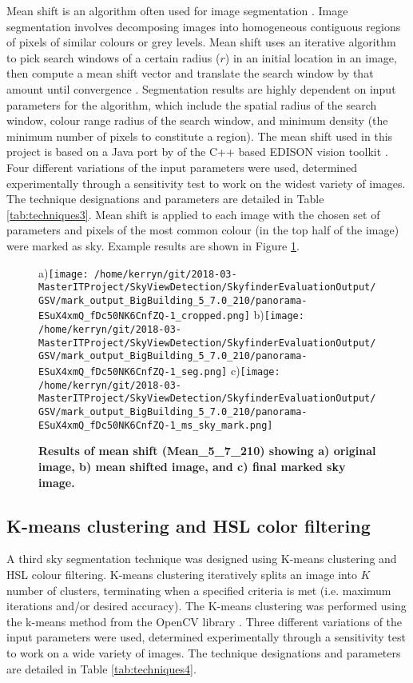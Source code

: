 \documentclass[final,3p,times,authoryear]{elsarticle}
\begin{document}
Mean shift is an algorithm often used for image segmentation \citep{Comaniciu1997,Comaniciu2002}. Image segmentation involves decomposing images into homogeneous contiguous regions of pixels of similar colours or grey levels. Mean shift uses an iterative algorithm to pick search windows of a certain radius ($r$) in an initial location in an image, then compute a mean shift vector and translate the search window by that amount until convergence \citep{Comaniciu1997}. Segmentation results are highly dependent on input parameters for the algorithm, which include the spatial radius of the search window, colour range radius of the search window, and minimum density (the minimum number of pixels to constitute a region). The mean shift used in this project is based on a Java port by \cite{Pangburn2002} of the C++ based EDISON vision toolkit \citep{Christoudias2002}. Four different variations of the input parameters were used, determined experimentally through a sensitivity test to work on the widest variety of images. The technique designations and parameters are detailed in Table \ref{tab:techniques3}. Mean shift is applied to each image with the chosen set of parameters and pixels of the most common colour (in the top half of the image) were marked as sky. Example results are shown in Figure \ref{fig:meanresults}.


\begin{figure}
\centering    
a)\texttt{[image: /home/kerryn/git/2018-03-MasterITProject/SkyViewDetection/SkyfinderEvaluationOutput/GSV/mark\_output\_BigBuilding\_5\_7.0\_210/panorama-ESuX4xmQ\_fDc50NK6CnfZQ-1\_cropped.png]} 
b)\texttt{[image: /home/kerryn/git/2018-03-MasterITProject/SkyViewDetection/SkyfinderEvaluationOutput/GSV/mark\_output\_BigBuilding\_5\_7.0\_210/panorama-ESuX4xmQ\_fDc50NK6CnfZQ-1\_seg.png]} 
c)\texttt{[image: /home/kerryn/git/2018-03-MasterITProject/SkyViewDetection/SkyfinderEvaluationOutput/GSV/mark\_output\_BigBuilding\_5\_7.0\_210/panorama-ESuX4xmQ\_fDc50NK6CnfZQ-1\_ms\_sky\_mark.png]} 
\caption{\bf  Results of mean shift (Mean\_5\_7\_210) showing a) original image, b) mean shifted image, and c) final marked sky image.}    
 \label{fig:meanresults}  
\end{figure} 



\subsection{K-means clustering and HSL color filtering}\label{sec:kmeans}
A third sky segmentation technique was designed using K-means clustering and HSL colour filtering. K-means clustering iteratively splits an image into $K$ number of clusters, terminating when a specified criteria is met (i.e. maximum iterations and/or desired accuracy). The K-means clustering was performed using the k-means method from the OpenCV library \citep{Bradski2000}. Three different variations of the input parameters were used, determined experimentally through a sensitivity test to work on a wide variety of images. The technique designations and parameters are detailed in Table \ref{tab:techniques4}. 
\end{document}
